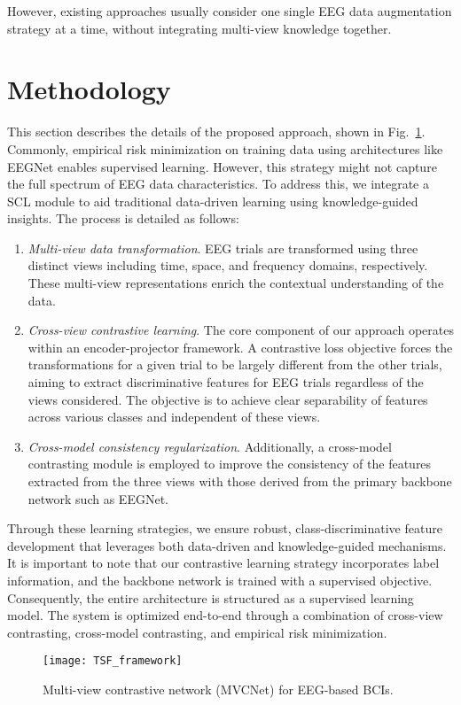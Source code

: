 \documentclass[journal]{IEEEtran}
\begin{document}
However, existing approaches usually consider one single EEG data augmentation strategy at a time, without integrating multi-view knowledge together. 

\section{Methodology} \label{sect:me}
This section describes the details of the proposed approach, shown in Fig.~\ref{fig:TSF}. Commonly, empirical risk minimization on training data using architectures like EEGNet enables supervised learning. However, this strategy might not capture the full spectrum of EEG data characteristics. To address this, we integrate a SCL module to aid traditional data-driven learning using knowledge-guided insights. The process is detailed as follows:
\begin{enumerate}
\item \textit{Multi-view data transformation}. EEG trials are transformed using three distinct views including time, space, and frequency domains, respectively. These multi-view representations enrich the contextual understanding of the data.
\item \textit{Cross-view contrastive learning}. The core component of our approach operates within an encoder-projector framework. A contrastive loss objective forces the transformations for a given trial to be largely different from the other trials, aiming to extract discriminative features for EEG trials regardless of the views considered. The objective is to achieve clear separability of features across various classes and independent of these views.
\item \textit{Cross-model consistency regularization}. Additionally, a cross-model contrasting module is employed to improve the consistency of the features extracted from the three views with those derived from the primary backbone network such as EEGNet.
\end{enumerate}

Through these learning strategies, we ensure robust, class-discriminative feature development that leverages both data-driven and knowledge-guided mechanisms. It is important to note that our contrastive learning strategy incorporates label information, and the backbone network is trained with a supervised objective. Consequently, the entire architecture is structured as a supervised learning model. The system is optimized end-to-end through a combination of cross-view contrasting, cross-model contrasting, and empirical risk minimization.
\begin{figure}[htpb] \centering
\texttt{[image: TSF\_framework]}
\caption{Multi-view contrastive network (MVCNet) for EEG-based BCIs.} \label{fig:TSF}
\end{figure}
\end{document}
